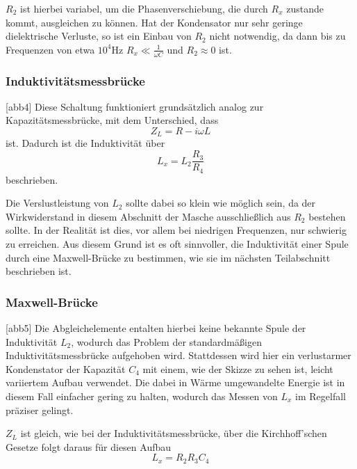 $R_2$ ist hierbei variabel, um die Phasenverschiebung, die durch $R_x$ zustande kommt, ausgleichen zu können.
Hat der Kondensator nur sehr geringe dielektrische Verluste, so ist ein Einbau von $R_2$ nicht notwendig, 
da dann bis zu Frequenzen von etwa $10^4\si{\hertz}$ $R_x \ll \frac{1}{\omega C}$ und 
$R_2 \approx 0$ ist.

\subsubsection{Induktivitätsmessbrücke}

[abb4]
Diese Schaltung funktioniert grundsätzlich analog zur Kapazitätsmessbrücke, mit dem Unterschied, dass 
\begin{equation*}
    Z_L = R - i\omega L
\end{equation*}
ist. Dadurch ist die Induktivität über \begin{equation}
\label{eqn:induk}
    L_x = L_2 \frac{R_3}{R_4}
\end{equation} beschrieben.

Die Verslustleistung von $L_2$ sollte dabei so klein wie möglich sein, da der Wirkwiderstand in diesem Abschnitt
der Masche
ausschließlich aus $R_2$ bestehen sollte. In der Realität ist dies, vor allem bei niedrigen Frequenzen, nur schwierig 
zu erreichen. Aus diesem Grund ist es oft sinnvoller, die Induktivität einer Spule durch eine Maxwell-Brücke zu 
bestimmen, wie sie im nächsten Teilabschnitt beschrieben ist.

\subsubsection{Maxwell-Brücke}

[abb5]
Die Abgleichelemente entalten hierbei keine bekannte Spule der Induktivität $L_2$, wodurch das Problem der 
standardmäßigen Induktivitätsmessbrücke aufgehoben wird. Stattdessen wird hier ein verlustarmer Kondenstator
der Kapazität $C_4$ mit einem, wie der Skizze zu sehen ist, leicht variiertem Aufbau verwendet. Die dabei
in Wärme umgewandelte Energie ist in diesem Fall einfacher gering zu halten, wodurch das Messen von $L_x$
im Regelfall präziser gelingt.

$Z_L$ ist gleich, wie bei der Induktivitätsmessbrücke, über die Kirchhoff'schen Gesetze folgt daraus für
diesen Aufbau \begin{equation}
\label{eqn:maxwell}
    L_x = R_2 R_3 C_4
\end{equation}

